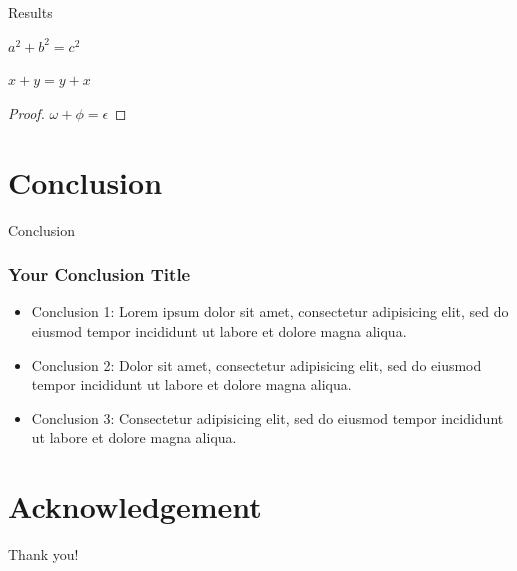 \documentclass[10pt]{beamer}
\begin{document}
\begin{frame}{Results}
    \begin{theorem}[Pythagoras] 
      $ a^2 + b^2 = c^2$
    \end{theorem}
    \begin{corollary}
     $ x + y = y + x  $
    \end{corollary}
    \begin{proof}
     $\omega +\phi = \epsilon $
    \end{proof}
\end{frame}


\section{Conclusion}

\begin{frame}{Conclusion}
    \frametitle{Your Conclusion Title}
	\begin{itemize}
	    \item Conclusion 1: Lorem ipsum dolor sit amet, consectetur adipisicing elit, sed do eiusmod tempor incididunt ut labore et dolore magna aliqua.
            \item Conclusion 2: Dolor sit amet, consectetur adipisicing elit, sed do eiusmod tempor incididunt ut labore et dolore magna aliqua.
            \item Conclusion 3: Consectetur adipisicing elit, sed do eiusmod tempor incididunt ut labore et dolore magna aliqua.
	\end{itemize}
\end{frame}


\section*{Acknowledgement}  
\begin{frame}
\textcolor{myNewColorA}{\Huge{\centerline{Thank you!}}}
\end{frame}
\end{document}
